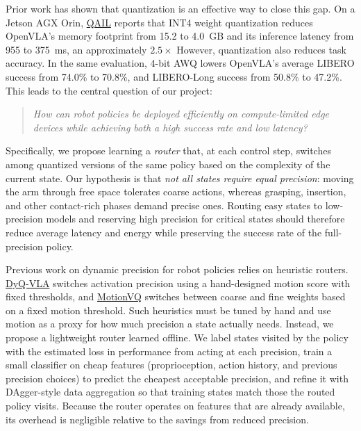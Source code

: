 \documentclass[11pt]{article}
\begin{document}
Prior work has shown that quantization is an effective way to close
this gap. On a Jetson AGX Orin,
\href{https://arxiv.org/abs/2412.01034}{QAIL} reports that INT4 weight
quantization reduces OpenVLA's memory footprint from 15.2 to 4.0~GB and
its inference latency from 955 to 375~ms, an approximately $2.5\times$
However, quantization also reduces task accuracy. In the same
evaluation, 4-bit AWQ lowers OpenVLA's average LIBERO success from
74.0\% to 70.8\%, and LIBERO-Long success from 50.8\% to 47.2\%.
This leads to the central question of our project:
\begin{quote}
\emph{How can robot policies be deployed efficiently on compute-limited
edge devices while achieving both a high success rate and low latency?}
\end{quote}

Specifically, we propose learning a \emph{router} that, at each control
step, switches among quantized versions of the same policy based on the
complexity of the current state. Our hypothesis is that \emph{not all
states require equal precision}: moving the arm through free space
tolerates coarse actions, whereas grasping, insertion, and other
contact-rich phases demand precise ones. Routing easy states to
low-precision models and reserving high precision for critical states
should therefore reduce average latency and energy while preserving the
success rate of the full-precision policy.

Previous work on dynamic precision for robot policies relies on
heuristic routers.
\href{https://arxiv.org/abs/2603.07904}{DyQ-VLA} switches activation
precision using a hand-designed motion score with fixed thresholds, and
\href{https://arxiv.org/abs/2607.24148}{MotionVQ} switches between
coarse and fine weights based on a fixed motion threshold. Such
heuristics must be tuned by hand and use motion as a proxy for how much
precision a state actually needs. Instead, we propose a lightweight
router learned offline. We label states visited by the policy with the
estimated loss in performance from acting at each precision, train a
small classifier on cheap features (proprioception, action history, and
previous precision choices) to predict the cheapest acceptable
precision, and refine it with DAgger-style data aggregation so that
training states match those the routed policy visits. Because the
router operates on features that are already available, its overhead is
negligible relative to the savings from reduced precision.
\end{document}
